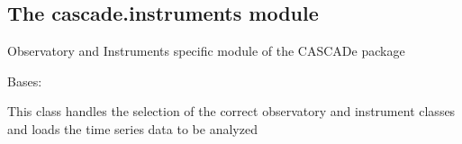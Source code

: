\documentclass[a4paper,10pt,english]{sphinxmanual}
\begin{document}
\subsection{The cascade.instruments module}
\label{\detokenize{cascade.instruments:module-cascade.instruments.instruments}}\label{\detokenize{cascade.instruments:the-cascade-instruments-module}}\label{\detokenize{cascade.instruments::doc}}
Observatory and Instruments specific module of the CASCADe package

\begin{fulllineitems}
\label{\detokenize{cascade.instruments:cascade.instruments.instruments.Observation}}
Bases: 

This class handles the selection of the correct observatory and
instrument classes and loads the time series data to be analyzed

\end{fulllineitems}

\end{document}
